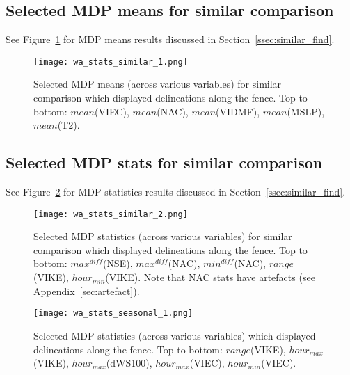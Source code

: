 \subsection{Selected MDP means for similar comparison}

See Figure~\ref{fig:wa_stats_similiar_1} for \ac{MDP} means results discussed in Section~\ref{ssec:similar_find}.

\begin{figure}[!htp]
	\centering
	\texttt{[image: wa\_stats\_similar\_1.png]}
	\caption[Selected MDP means for similar comparison]{Selected \ac{MDP} means (across various variables) for similar comparison which displayed delineations along the fence. Top to bottom: $mean$(\acs{VIEC}), $mean$(\acs{NAC}), $mean$(\acs{VIDMF}), $mean$(\acs{MSLP}), $mean$(\acs{T2}).}
	\label{fig:wa_stats_similiar_1}
\end{figure}

\subsection{Selected MDP stats for similar comparison}

See Figure~\ref{fig:wa_stats_similiar_2} for \ac{MDP} statistics results discussed in Section~\ref{ssec:similar_find}.

\begin{figure}[!htp]
	\centering
	\texttt{[image: wa\_stats\_similar\_2.png]}
	\caption[Selected MDP stats for similar comparison]{Selected \ac{MDP} statistics (across various variables) for similar comparison which displayed delineations along the fence. Top to bottom: $max^{diff}$(\acs{NSE}), $max^{diff}$(\acs{NAC}), $min^{diff}$(\acs{NAC}), $range$(\acs{VIKE}), $hour_{min}$(\acs{VIKE}). Note that \ac{NAC} stats have artefacts (see Appendix~\ref{sec:artefact}).}
	\label{fig:wa_stats_similiar_2}
\end{figure}

\begin{figure}[!htp]
	\centering
	\texttt{[image: wa\_stats\_seasonal\_1.png]}
	\caption[Selected MDP statistics with fence delineations]{Selected \ac{MDP} statistics (across various variables) which displayed delineations along the fence. Top to bottom: $range$(\acs{VIKE}), $hour_{max}$(\acs{VIKE}), $hour_{max}$(\acs{dWS100}), $hour_{max}$(\acs{VIEC}), $hour_{min}$(\acs{VIEC}).}
	\label{fig:wa_stats_seasonal_1}
\end{figure}

